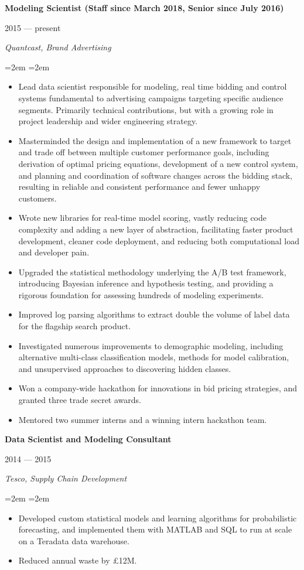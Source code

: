 \documentclass[letterpaper,10pt]{article}
\newcommand{\sepspace}{\vspace*{0.3em}}
\newcommand{\MainHeading}[1]{\noindent\textbf{#1}}
\newcommand{\SubHeading}[1]{\noindent\textit{#1}}
\newcommand{\DateBox}[1]{\colorbox{light-gray}{\parbox{8em}{\hfill\color{White}#1}}}
\newcommand{\Details}[1]{\hangindent=2em\hangafter=0\small#1\normalsize\par}
\newcommand{\WorkEntry}[4]{%
                \MainHeading{#1} \hfill \DateBox{#2} \par
                \SubHeading{#3} \par
                \noindent \hangindent=2em \hangafter=0 \Details{#4} }
\begin{document}
\WorkEntry{Modeling Scientist (Staff since March 2018, Senior since July 2016)}{2015 --- present}{Quantcast, Brand Advertising}{
\begin{itemize}
 \item Lead data scientist responsible for modeling, real time bidding and control systems fundamental to advertising campaigns targeting specific audience segments. Primarily technical contributions, but with a growing role in project leadership and wider engineering strategy.
 \item Masterminded the design and implementation of a new framework to target and trade off between multiple customer performance goals, including derivation of optimal pricing equations, development of a new control system, and planning and coordination of software changes across the bidding stack, resulting in reliable and consistent performance and fewer unhappy customers.
 \item Wrote new libraries for real-time model scoring, vastly reducing code complexity and adding a new layer of abstraction, facilitating faster product development, cleaner code deployment, and reducing both computational load and developer pain.
 \item Upgraded the statistical methodology underlying the A/B test framework, introducing Bayesian inference and hypothesis testing, and providing a rigorous foundation for assessing hundreds of modeling experiments.
 \item Improved log parsing algorithms to extract double the volume of label data for the flagship search product.
 \item Investigated numerous improvements to demographic modeling, including alternative multi-class classification models, methods for model calibration, and unsupervised approaches to discovering hidden classes.
 \item Won a company-wide hackathon for innovations in bid pricing strategies, and granted three trade secret awards.
 \item Mentored two summer interns and a winning intern hackathon team.%
\end{itemize}
}
\sepspace

\WorkEntry{Data Scientist and Modeling Consultant}{2014 --- 2015}{Tesco, Supply Chain Development}{
\begin{itemize}
 \item Developed custom statistical models and learning algorithms for probabilistic forecasting, and implemented them with MATLAB and SQL to run at scale on a Teradata data warehouse.
 \item Reduced annual waste by \pounds12M.
\end{itemize}
}
\sepspace
\end{document}
